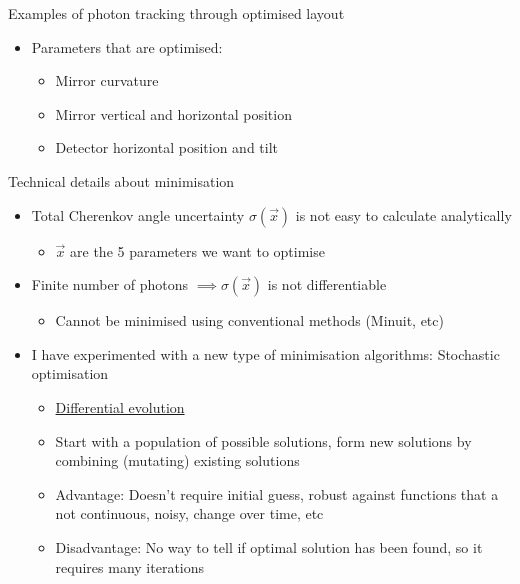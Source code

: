 \documentclass{beamer}
\begin{document}
\begin{frame}{Examples of photon tracking through optimised layout}
\begin{figure}
  \end{figure}
  \vspace{-0.3cm}
  \begin{itemize}
    \item{Parameters that are optimised:}
    \begin{itemize}
      \item{Mirror curvature}
      \item{Mirror vertical and horizontal position}
      \item{Detector horizontal position and tilt}
    \end{itemize}
  \end{itemize}
\end{frame}

\begin{frame}{Technical details about minimisation}
  \setlength\itemsep{1.0em}
  \begin{itemize}
    \item{Total Cherenkov angle uncertainty $\sigma(\vec{x})$ is not easy to calculate analytically}
    \begin{itemize}
      \item{$\vec{x}$ are the 5 parameters we want to optimise}
    \end{itemize}
    \item{Finite number of photons $\implies\sigma(\vec{x})$ is not differentiable}
    \begin{itemize}
      \item{Cannot be minimised using conventional methods (Minuit, etc)}
    \end{itemize}
    \item{I have experimented with a new type of minimisation algorithms: Stochastic optimisation}
    \begin{itemize}
      \item{\href{https://en.wikipedia.org/wiki/Differential_evolution}{Differential evolution}}
      \item{Start with a population of possible solutions, form new solutions by combining (mutating) existing solutions}
      \item{Advantage: Doesn't require initial guess, robust against functions that a not continuous, noisy, change over time, etc}
      \item{Disadvantage: No way to tell if optimal solution has been found, so it requires many iterations}
    \end{itemize}
  \end{itemize}
\end{frame}
\end{document}
